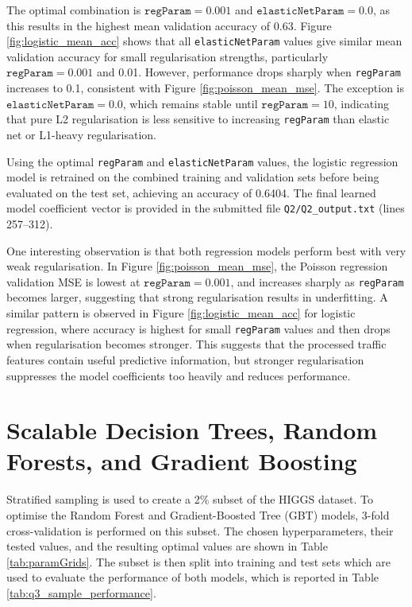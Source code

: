 \documentclass[12pt, a4paper]{article}
\begin{document}
The optimal combination is \(\texttt{regParam}=0.001\) and \(\texttt{elasticNetParam}=0.0\), as this results in the highest mean validation accuracy of 0.63.
Figure \ref{fig:logistic_mean_acc} shows that all \texttt{elasticNetParam} values give similar mean validation accuracy for small regularisation strengths, particularly \(\texttt{regParam}=0.001\) and 0.01.
However, performance drops sharply when \texttt{regParam} increases to 0.1, consistent with Figure \ref{fig:poisson_mean_mse}.
The exception is \(\texttt{elasticNetParam}=0.0\), which remains stable until \(\texttt{regParam}=10\), indicating that pure L2 regularisation is less sensitive to increasing \texttt{regParam} than elastic net or L1-heavy regularisation.

Using the optimal \texttt{regParam} and \texttt{elasticNetParam} values, the logistic regression model is retrained on the combined training and validation sets before being evaluated on the test set, achieving an accuracy of 0.6404.
The final learned model coefficient vector is provided in the submitted file \texttt{Q2/Q2\_output.txt} (lines 257--312).


One interesting observation is that both regression models perform best with very weak regularisation.
In Figure \ref{fig:poisson_mean_mse}, the Poisson regression validation MSE is lowest at \(\texttt{regParam}=0.001\), and increases sharply as \texttt{regParam} becomes larger, suggesting that strong regularisation results in underfitting.
A similar pattern is observed in Figure \ref{fig:logistic_mean_acc} for logistic regression, where accuracy is highest for small \texttt{regParam} values and then drops when regularisation becomes stronger.
This suggests that the processed traffic features contain useful predictive information, but stronger regularisation suppresses the model coefficients too heavily and reduces performance.



\FloatBarrier
\section{Scalable Decision Trees, Random Forests, and Gradient Boosting}
Stratified sampling is used to create a 2\% subset of the HIGGS dataset.
To optimise the Random Forest and Gradient-Boosted Tree (GBT) models, 3-fold cross-validation is performed on this subset.
The chosen hyperparameters, their tested values, and the resulting optimal values are shown in Table \ref{tab:paramGrids}.
The subset is then split into training and test sets which are used to evaluate the performance of both models, which is reported in Table \ref{tab:q3_sample_performance}.
\end{document}
